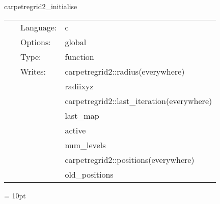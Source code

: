 \hspace{5mm} carpetregrid2\_initialise 

\hspace{5mm}{\it initialise locations of refined regions } 


\hspace{5mm}

 \begin{tabular*}{160mm}{cll} 
~ & Language:  & c \\ 
~ & Options:  & global \\ 
~ & Type:  & function \\ 
~ & Writes:  & carpetregrid2::radius(everywhere) \\ 
~& ~ &radiixyz\\ 
~& ~ &carpetregrid2::last\_iteration(everywhere)\\ 
~& ~ &last\_map\\ 
~& ~ &active\\ 
~& ~ &num\_levels\\ 
~& ~ &carpetregrid2::positions(everywhere)\\ 
~& ~ &old\_positions\\ 
\end{tabular*} 



\vspace{5mm}\parskip = 10pt 

